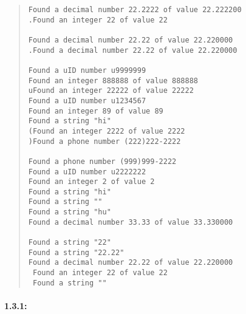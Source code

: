 \documentclass[a4paper]{article}
\begin{document}
\begin{quote}
\begin{verbatim}
Found a decimal number 22.2222 of value 22.222200
.Found an integer 22 of value 22

Found a decimal number 22.22 of value 22.220000
.Found a decimal number 22.22 of value 22.220000

Found a uID number u9999999
Found an integer 888888 of value 888888
uFound an integer 22222 of value 22222
Found a uID number u1234567
Found an integer 89 of value 89
Found a string "hi"
(Found an integer 2222 of value 2222
)Found a phone number (222)222-2222

Found a phone number (999)999-2222
Found a uID number u2222222
Found an integer 2 of value 2
Found a string "hi"
Found a string ""
Found a string "hu"
Found a decimal number 33.33 of value 33.330000

Found a string "22"
Found a string "22.22"
Found a decimal number 22.22 of value 22.220000
 Found an integer 22 of value 22
 Found a string ""
\end{verbatim}
\end{quote}


\paragraph*{1.3.1:}
\end{document}
